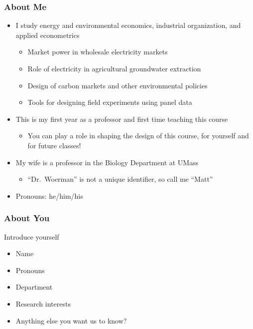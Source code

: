 \documentclass{beamer}\usepackage[]{graphicx}\usepackage[]{color}
\begin{document}
\begin{frame}\frametitle{About Me}
    \begin{itemize}
        \item I study energy and environmental economics, industrial organization, and applied econometrics
        \begin{itemize}
            \item Market power in wholesale electricity markets
            \item Role of electricity in agricultural groundwater extraction
            \item Design of carbon markets and other environmental policies
            \item Tools for designing field experiments using panel data
        \end{itemize}
        \item This is my first year as a professor and first time teaching this course
        \begin{itemize}
            \item You can play a role in shaping the design of this course, for yourself and for future classes!
        \end{itemize}
        \item My wife is a professor in the Biology Department at UMass
        \begin{itemize}
            \item ``Dr.\ Woerman'' is not a unique identifier, so call me ``Matt''
        \end{itemize}
        \item Pronouns: he/him/his
    \end{itemize}
\end{frame}

\begin{frame}\frametitle{About You}
    Introduce yourself
    \begin{itemize}
        \item Name
        \item Pronouns
        \item Department
        \item Research interests
        \item Anything else you want us to know?
    \end{itemize}
\end{frame}
\end{document}
